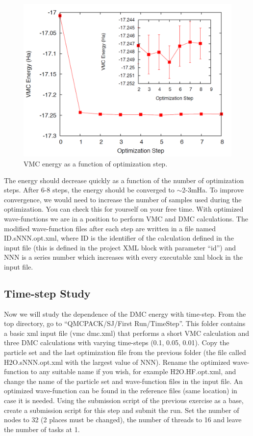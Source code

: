 \begin{figure}
\begin{center}
\includegraphics[trim = 0mm 0mm 0mm 0mm, clip,width=0.75\columnwidth]{./figures/lab_advanced_molecules_opt_conv}
\end{center}
\caption{VMC energy as a function of optimization step.
\label{fig:lam_opt_conv}
}
\end{figure}

The energy should decrease quickly as a function of the number of optimization steps.
After 6-8 steps, the energy should be converged to $\sim$2-3mHa. To improve convergence,
we would need to increase the number of samples used during the optimization. You can
check this for yourself on your free time. With optimized wave-functions we are in a position
to perform VMC and DMC calculations. The modified wave-function files after each step
are written in a file named ID.sNNN.opt.xml, where ID is the identifier of the calculation
defined in the input file (this is defined in the project XML block with parameter “id”) and
NNN is a series number which increases with every executable xml block in the input file.


\subsection{Time-step Study}
Now we will study the dependence of the DMC energy with time-step. From the top directory, 
go to “QMCPACK/SJ/First Run/TimeStep”. This folder contains a basic xml input
file (vmc dmc.xml) that performs a short VMC calculation and three DMC calculations
with varying time-steps (0.1, 0.05, 0.01). Copy the particle set and the last optimization
file from the previous folder (the file called H2O.sNNN.opt.xml with the largest value of
NNN). Rename the optimized wave-function to any suitable name if you wish, for example
H2O.HF.opt.xml, and change the name of the particle set and wave-function files in the
input file. An optimized wave-function can be found in the reference files (same location)
in case it is needed. Using the submission script of the previous exercise as a base, create a
submission script for this step and submit the run. Set the number of nodes to 32 (2 places
must be changed), the number of threads to 16 and leave the number of tasks at 1.

